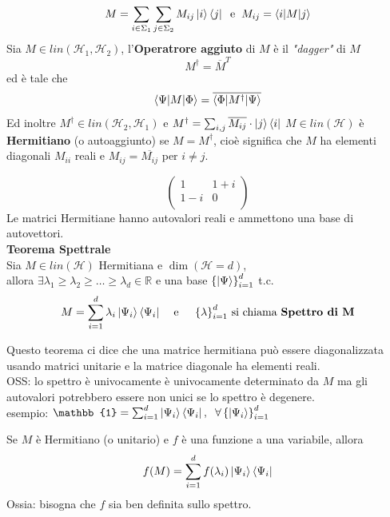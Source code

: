 \documentclass{report}
\begin{document}
$$M = \sum_{i \in \Sigma_1}\sum_{j \in \Sigma_2} M_{ij} \ket{i}\bra{j}\hspace{0.2cm} \text{e} \hspace{0.2cm} M_{ij} = \braket{i|M|j}$$
Sia  $M\in \textit{lin}(\mathcal{H}_1,\mathcal{H}_2)$, l'\textbf{Operatrore aggiuto} di $M$ è il \textit{"dagger"} di $M$
$$M^\dagger = \overline{M}^T$$
ed è tale che $$\braket{\Psi|M|\Phi} = \overline{\braket{\Phi|M^\dagger|\Psi}}$$
Ed inoltre $M^\dagger\in \textit{lin}(\mathcal{H}_2,\mathcal{H}_1)$ e $M^\dagger = \sum_{i,j} \overline{M_{ij}} \cdot\ket{j}\bra{i}$
\newpage
$M\in \textit{lin}(\mathcal{H})$ è \textbf{Hermitiano} (o autoaggiunto) se $M = M^\dagger$, cioè significa che $M$ ha elementi diagonali $M_{ii}$ reali e $M_{ij} = \overline{M_{ij}}$ per $i\neq j$.

$$\begin{pmatrix}
    1 & 1+i \\
    1-i & 0\\
\end{pmatrix}$$
Le matrici Hermitiane hanno autovalori reali e ammettono una base di autovettori.
\medskip
\\ \textbf{Teorema Spettrale}
\\Sia $M\in \textit{lin}(\mathcal{H})$ Hermitiana e $\dim (\mathcal{H} = d)$,\\ allora 
$\exists \lambda_1\ge\lambda_2\ge\dots\ge \lambda_d \in \mathbb{R}$ e una base $\left\{\ket{\Psi}\right\} ^d_{i=1} $ t.c.
$$M = \sum^d_{i=1}\lambda_i \ket{\Psi_i}\bra{\Psi_i}\hspace{0.4cm} \text{e\hspace{0.4cm} $\left\{ \lambda\right\} ^d_{i=1} $ si chiama \textbf{Spettro di M}}$$

Questo teorema ci dice che una matrice hermitiana può essere diagonalizzata usando matrici unitarie e la matrice diagonale ha elementi reali.
\medskip
\\OSS: lo spettro è univocamente è univocamente determinato da $M$ ma gli autovalori potrebbero essere non unici se lo spettro è degenere.
\\esempio: $\mathbb{1} = \sum^d_{i=1}\ket{\Psi_i}\bra{\Psi_i}, \hspace{0.2cm} \forall \left\{ \ket{\Psi_i}\right\} ^d_{i=1}$ 

\medskip
Se $M$ è Hermitiano  (o unitario) e $f$ è una funzione a una variabile, allora
$$f(M) = \sum^d_{i=1} f(\lambda_i)\ket{\Psi_i} \bra{\Psi_i}$$
Ossia: bisogna che $f$ sia ben definita sullo spettro.
\end{document}
